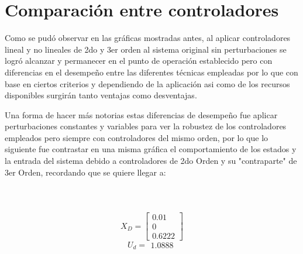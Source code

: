 \documentclass[onecolumn,10pt]{article}
\begin{document}
\section*{Comparaci\'on entre controladores}
Como se pud\'o observar en las gr\'aficas mostradas antes, al aplicar controladores lineal y no lineales de 2do y 3er orden al sistema original sin perturbaciones se logr\'o alcanzar y permanecer en el punto de operaci\'on establecido pero con diferencias en el desempe\~no entre las diferentes t\'ecnicas empleadas por lo que con base en ciertos criterios y dependiendo de la aplicaci\'on asi como de los recursos disponibles surgir\'an tanto ventajas como desventajas.

Una forma de hacer m\'as notorias estas diferencias de desempe\~no fue aplicar perturbaciones constantes y variables para ver la robustez de los controladores empleados pero siempre con controladores del mismo orden, por lo que lo siguiente fue contrastar en una misma gr\'afica el comportamiento de los estados y la entrada del sistema debido a controladores de 2do Orden y su "contraparte" de 3er Orden, recordando que se quiere llegar a:
\\
\\
\\
\\
$$
X_{D}=\begin{bmatrix}
0.01 \\ 0 \\ 0.6222 
\end{bmatrix}
$$
$$
U_{d}=\begin{matrix}
1.0888
\end{matrix}
$$
\end{document}
